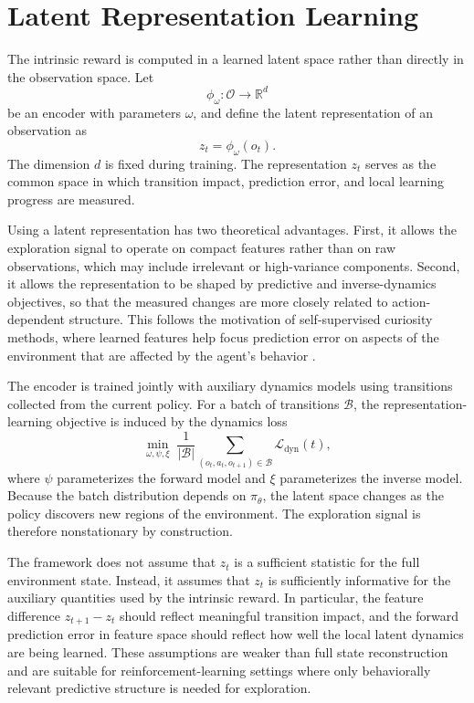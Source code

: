 \section{Latent Representation Learning}
\label{sec:latent_representation_learning}

The intrinsic reward is computed in a learned latent space rather than directly in the observation space.
Let
\begin{equation}
    \phi_\omega:\mathcal{O}\rightarrow\mathbb{R}^{d}
\end{equation}
be an encoder with parameters $\omega$, and define the latent representation of an observation as
\begin{equation}
    z_t=\phi_\omega(o_t).
\end{equation}
The dimension $d$ is fixed during training.
The representation $z_t$ serves as the common space in which transition impact, prediction error, and local learning progress are measured.

Using a latent representation has two theoretical advantages.
First, it allows the exploration signal to operate on compact features rather than on raw observations, which may include irrelevant or high-variance components.
Second, it allows the representation to be shaped by predictive and inverse-dynamics objectives, so that the measured changes are more closely related to action-dependent structure.
This follows the motivation of self-supervised curiosity methods, where learned features help focus prediction error on aspects of the environment that are affected by the agent's behavior \parencite{pathak-2017}.

The encoder is trained jointly with auxiliary dynamics models using transitions collected from the current policy.
For a batch of transitions $\mathcal{B}$, the representation-learning objective is induced by the dynamics loss
\begin{equation}
    \min_{\omega,\psi,\xi}\;
    \frac{1}{|\mathcal{B}|}\sum_{(o_t,a_t,o_{t+1})\in\mathcal{B}}
    \mathcal{L}_{\mathrm{dyn}}(t),
\end{equation}
where $\psi$ parameterizes the forward model and $\xi$ parameterizes the inverse model.
Because the batch distribution depends on $\pi_\theta$, the latent space changes as the policy discovers new regions of the environment.
The exploration signal is therefore nonstationary by construction.

The framework does not assume that $z_t$ is a sufficient statistic for the full environment state.
Instead, it assumes that $z_t$ is sufficiently informative for the auxiliary quantities used by the intrinsic reward.
In particular, the feature difference $z_{t+1}-z_t$ should reflect meaningful transition impact, and the forward prediction error in feature space should reflect how well the local latent dynamics are being learned.
These assumptions are weaker than full state reconstruction and are suitable for reinforcement-learning settings where only behaviorally relevant predictive structure is needed for exploration.